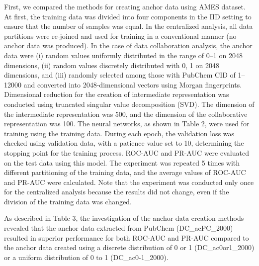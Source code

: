 \documentclass{article}
\begin{document}
\label{sec:sample1}
First, we compared the methods for creating anchor data using AMES dataset. At first, the training data was divided into four components in the IID setting to ensure that the number of samples was equal. In the centralized analysis, all data partitions were re-joined and used for training in a conventional manner (no anchor data was produced).
In the case of data collaboration analysis, the anchor data were (i) random values uniformly distributed in the range of 0–1 on 2048 dimensions, (ii) random values discretely distributed with 0, 1 on 2048 dimensions, and (iii) randomly selected among those with PubChem CID of 1–12000 and converted into 2048-dimensional vectors using Morgan fingerprints. Dimensional reduction for the creation of intermediate representation was conducted using truncated singular value decomposition (SVD). The dimension of the intermediate representation was 500, and the dimension of the collaborative representation was 100. The neural networks, as shown in Table 2, were used for training using the training data. During each epoch, the validation loss was checked using validation data, with a patience value set to 10, determining the stopping point for the training process. ROC-AUC and PR-AUC were evaluated on the test data using this model. The experiment was repeated 5 times with different partitioning of the training data, and the average values of ROC-AUC and PR-AUC were calculated. Note that the experiment was conducted only once for the centralized analysis because the results did not change, even if the division of the training data was changed.

As described in Table 3, the investigation of the anchor data creation methods revealed that the anchor data extracted from PubChem (DC\_acPC\_2000) resulted in superior performance for both ROC-AUC and PR-AUC compared to the anchor data created using a discrete distribution of 0 or 1 (DC\_ac0or1\_2000) or a uniform distribution of 0 to 1 (DC\_ac0-1\_2000).

\begin{table}[htbp]
\centering
\caption{Parameters of neural network used in this study.}
  \label{tab:Table 2}
\end{table}
\end{document}
